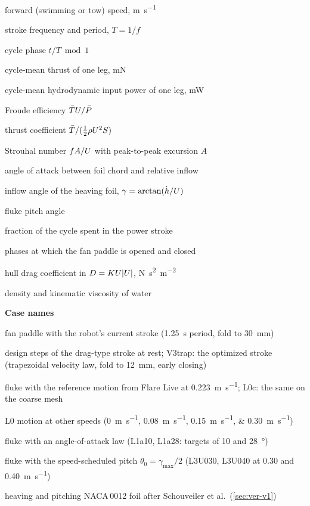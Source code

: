 \bigskip
\begin{description}[labelwidth=16mm,leftmargin=20mm,itemsep=1pt,font=\normalfont]
\item[$\U$] forward (swimming or tow) speed, \si{\metre\per\second}
\item[$f,\;T$] stroke frequency and period, $T=1/f$
\item[$\tau$] cycle phase $t/T\bmod 1$
\item[$\Tm$] cycle-mean thrust of one leg, \si{\milli\newton}
\item[$\Pm$] cycle-mean hydrodynamic input power of one leg, \si{\milli\watt}
\item[$\etaF$] Froude efficiency $\bar{T}U/\bar{P}$
\item[$C_T$] thrust coefficient $\bar{T}/(\tfrac12\rho U^2S)$
\item[$\mathit{St}$] Strouhal number $fA/U$ with peak-to-peak excursion $A$
\item[$\alpha$] angle of attack between foil chord and relative inflow
\item[$\gamma$] inflow angle of the heaving foil, $\gamma=\arctan(\dot h/U)$
\item[$\theta$] fluke pitch angle
\item[$\mathrm{DUTY}$] fraction of the cycle spent in the power stroke
\item[$\tau_o,\tau_c$] phases at which the fan paddle is opened and closed
\item[$K$] hull drag coefficient in $D=KU|U|$, \si{\newton\second\squared\per\metre\squared}
\item[$\rho,\nu$] density and kinematic viscosity of water
\end{description}

\bigskip
\noindent\textbf{Case names}
\begin{description}[labelwidth=16mm,leftmargin=20mm,itemsep=1pt,font=\normalfont\bfseries]
\item[Robot gait] fan paddle with the robot's current stroke (\SI{1.25}{\second} period, fold to \SI{30}{\milli\metre})
\item[V1--V3] design steps of the drag-type stroke at rest; V3trap: the optimized stroke (trapezoidal velocity law, fold to \SI{12}{\milli\metre}, early closing)
\item[L0] fluke with the reference motion from Flare Live at \SI{0.223}{\metre\per\second}; L0c: the same on the coarse mesh
\item[L2] L0 motion at other speeds (\SIlist{0;0.08;0.15;0.30}{\metre\per\second})
\item[L1] fluke with an angle-of-attack law (L1a10, L1a28: targets of \SI{10}{} and \SI{28}{\degree})
\item[L3] fluke with the speed-scheduled pitch $\theta_0=\gamma_\text{max}/2$ (L3U030, L3U040 at \SI{0.30}{} and \SI{0.40}{\metre\per\second})
\item[Validation] heaving and pitching NACA\,0012 foil after Schouveiler et al.\ (\cref{sec:ver-v1})
\end{description}
